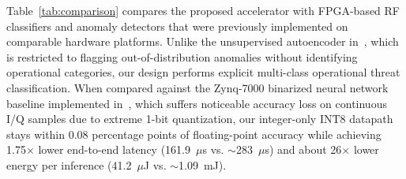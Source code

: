 \documentclass[conference]{IEEEtran}
\begin{document}


Table~\ref{tab:comparison} compares the proposed accelerator with FPGA-based RF classifiers and anomaly detectors that were previously implemented on comparable hardware platforms. Unlike the unsupervised autoencoder in~\cite{b10}, which is restricted to flagging out-of-distribution anomalies without identifying operational categories, our design performs explicit multi-class operational threat classification. When compared against the Zynq-7000 binarized neural network baseline implemented in~\cite{b14}, which suffers noticeable accuracy loss on continuous I/Q samples due to extreme 1-bit quantization, our integer-only INT8 datapath stays within 0.08 percentage points of floating-point accuracy while achieving 1.75$\times$ lower end-to-end latency (161.9~$\mu$s vs. $\sim$283~$\mu$s) and about 26$\times$ lower energy per inference (41.2~$\mu$J vs. $\sim$1.09~mJ).
\end{document}
